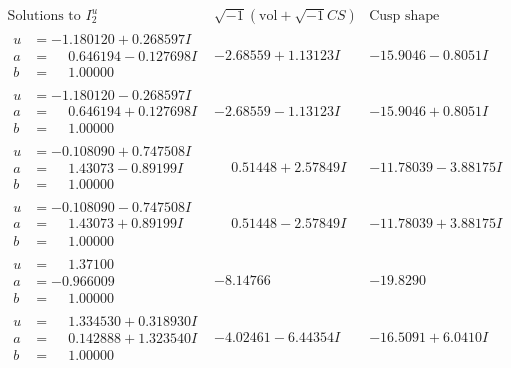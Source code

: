 \documentclass[1p]{elsarticle_modified}
\theoremstyle{definition}
\newcommand{\I}{\sqrt{-1}}
\begin{document}
$$\begin{array}{c|c|c}  
\text{Solutions to }I^u_{2}& \I (\text{vol} + \sqrt{-1}CS) & \text{Cusp shape}\\
 \hline 
\begin{aligned}
u &= -1.180120 + 0.268597 I \\
a &= \phantom{-}0.646194 - 0.127698 I \\
b &= \phantom{-}1.00000\phantom{ +0.000000I}\end{aligned}
 & -2.68559 + 1.13123 I & -15.9046 - 0.8051 I \\ \hline\begin{aligned}
u &= -1.180120 - 0.268597 I \\
a &= \phantom{-}0.646194 + 0.127698 I \\
b &= \phantom{-}1.00000\phantom{ +0.000000I}\end{aligned}
 & -2.68559 - 1.13123 I & -15.9046 + 0.8051 I \\ \hline\begin{aligned}
u &= -0.108090 + 0.747508 I \\
a &= \phantom{-}1.43073 - 0.89199 I \\
b &= \phantom{-}1.00000\phantom{ +0.000000I}\end{aligned}
 & \phantom{-}0.51448 + 2.57849 I & -11.78039 - 3.88175 I \\ \hline\begin{aligned}
u &= -0.108090 - 0.747508 I \\
a &= \phantom{-}1.43073 + 0.89199 I \\
b &= \phantom{-}1.00000\phantom{ +0.000000I}\end{aligned}
 & \phantom{-}0.51448 - 2.57849 I & -11.78039 + 3.88175 I \\ \hline\begin{aligned}
u &= \phantom{-}1.37100\phantom{ +0.000000I} \\
a &= -0.966009\phantom{ +0.000000I} \\
b &= \phantom{-}1.00000\phantom{ +0.000000I}\end{aligned}
 & -8.14766\phantom{ +0.000000I} & -19.8290\phantom{ +0.000000I} \\ \hline\begin{aligned}
u &= \phantom{-}1.334530 + 0.318930 I \\
a &= \phantom{-}0.142888 + 1.323540 I \\
b &= \phantom{-}1.00000\phantom{ +0.000000I}\end{aligned}
 & -4.02461 - 6.44354 I & -16.5091 + 6.0410 I \\ \hline\begin{aligned}

\end{aligned}
\end{array}$$
\end{document}
